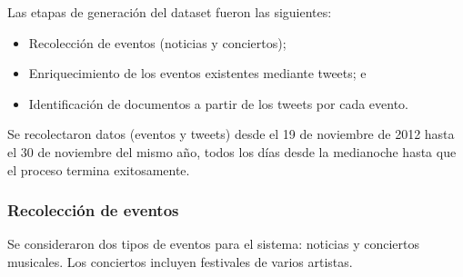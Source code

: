     Las etapas de generación del dataset fueron las siguientes:

\begin{itemize}
\item Recolección de eventos (noticias y conciertos);
\item Enriquecimiento de los eventos existentes mediante tweets; e
\item Identificación de documentos a partir de los tweets por cada evento.
\end{itemize}
    Se recolectaron datos (eventos y tweets) desde el 19 de noviembre de
    2012 hasta el 30 de noviembre del mismo año, todos los días
    desde la medianoche hasta que el proceso termina exitosamente.

\subsubsection{Recolección de eventos}

Se consideraron dos tipos de eventos para el sistema: noticias y
conciertos musicales. Los conciertos incluyen festivales de varios
artistas.

